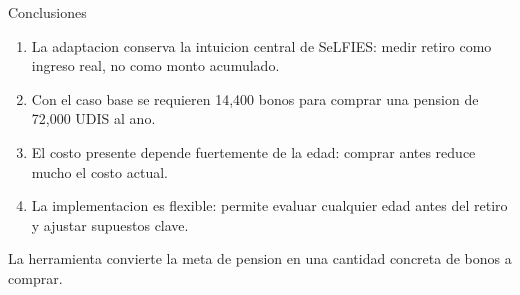 \documentclass[aspectratio=169,11pt]{beamer}
\newcommand{\udis}{\textsc{UDIS}}
\begin{document}
\begin{frame}{Conclusiones}
  \begin{enumerate}
    \item La adaptacion conserva la intuicion central de SeLFIES: medir retiro como ingreso real, no como monto acumulado.
    \item Con el caso base se requieren 14,400 bonos para comprar una pension de 72,000 \udis{} al ano.
    \item El costo presente depende fuertemente de la edad: comprar antes reduce mucho el costo actual.
    \item La implementacion es flexible: permite evaluar cualquier edad antes del retiro y ajustar supuestos clave.
  \end{enumerate}
  \vspace{0.35cm}
  \begin{center}
    \large La herramienta convierte la meta de pension en una cantidad concreta de bonos a comprar.
  \end{center}
\end{frame}
\end{document}
